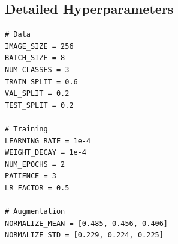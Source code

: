 \documentclass[12pt,a4paper]{article}
\begin{document}
\subsection{Detailed Hyperparameters}

\begin{lstlisting}[caption=Complete hyperparameter configuration]
# Data
IMAGE_SIZE = 256
BATCH_SIZE = 8
NUM_CLASSES = 3
TRAIN_SPLIT = 0.6
VAL_SPLIT = 0.2
TEST_SPLIT = 0.2

# Training
LEARNING_RATE = 1e-4
WEIGHT_DECAY = 1e-4
NUM_EPOCHS = 2
PATIENCE = 3
LR_FACTOR = 0.5

# Augmentation
NORMALIZE_MEAN = [0.485, 0.456, 0.406]
NORMALIZE_STD = [0.229, 0.224, 0.225]
\end{lstlisting}
\end{document}
